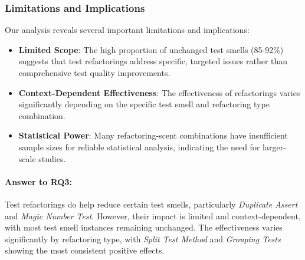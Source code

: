 \subsubsection{Limitations and Implications}

Our analysis reveals several important limitations and implications:

\begin{itemize}
    \item \textbf{Limited Scope}: The high proportion of unchanged test smells (85-92\%) suggests that test refactorings address specific, targeted issues rather than comprehensive test quality improvements.
    \item \textbf{Context-Dependent Effectiveness}: The effectiveness of refactorings varies significantly depending on the specific test smell and refactoring type combination.
    \item \textbf{Statistical Power}: Many refactoring-scent combinations have insufficient sample sizes for reliable statistical analysis, indicating the need for larger-scale studies.
\end{itemize}

\paragraph{Answer to RQ3:} Test refactorings do help reduce certain test smells, particularly \textit{Duplicate Assert} and \textit{Magic Number Test}. However, their impact is limited and context-dependent, with most test smell instances remaining unchanged. The effectiveness varies significantly by refactoring type, with \textit{Split Test Method} and \textit{Grouping Tests} showing the most consistent positive effects. 